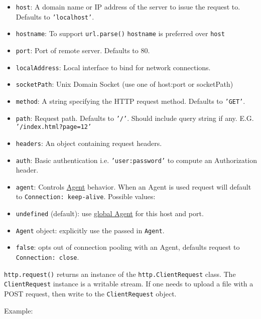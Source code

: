\begin{itemize}
\item
  \texttt{host}: A domain name or IP address of the server to issue the
  request to. Defaults to \texttt{'localhost'}.
\item
  \texttt{hostname}: To support \texttt{url.parse()} \texttt{hostname}
  is preferred over \texttt{host}
\item
  \texttt{port}: Port of remote server. Defaults to 80.
\item
  \texttt{localAddress}: Local interface to bind for network
  connections.
\item
  \texttt{socketPath}: Unix Domain Socket (use one of host:port or
  socketPath)
\item
  \texttt{method}: A string specifying the HTTP request method. Defaults
  to \texttt{'GET'}.
\item
  \texttt{path}: Request path. Defaults to \texttt{'/'}. Should include
  query string if any. E.G. \texttt{'/index.html?page=12'}
\item
  \texttt{headers}: An object containing request headers.
\item
  \texttt{auth}: Basic authentication i.e. \texttt{'user:password'} to
  compute an Authorization header.
\item
  \texttt{agent}: Controls \hyperref[http_class_http_agent]{Agent}
  behavior. When an Agent is used request will default to
  \texttt{Connection: keep-alive}. Possible values:
\item
  \texttt{undefined} (default): use
  \hyperref[http_http_globalagent]{global Agent} for this host and
  port.
\item
  \texttt{Agent} object: explicitly use the passed in \texttt{Agent}.
\item
  \texttt{false}: opts out of connection pooling with an Agent, defaults
  request to \texttt{Connection: close}.
\end{itemize}

\texttt{http.request()} returns an instance of the
\texttt{http.ClientRequest} class. The \texttt{ClientRequest} instance
is a writable stream. If one needs to upload a file with a POST request,
then write to the \texttt{ClientRequest} object.

Example:

